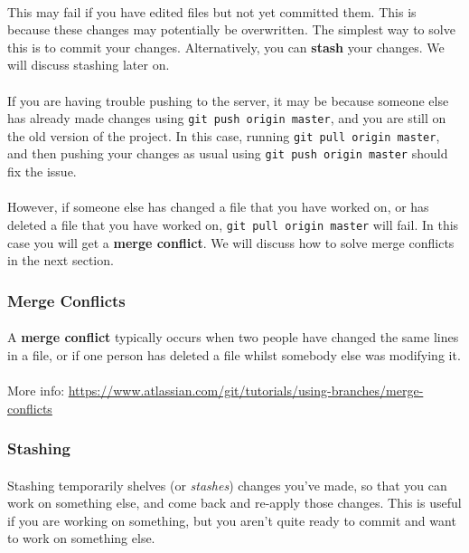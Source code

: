 \documentclass[11pt]{article}
\begin{document}
\paragraph{}
This may fail if you have edited files but not yet committed them. This is because these changes may potentially be overwritten. The simplest way to solve this is to commit your changes. Alternatively, you can \textbf{stash} your changes. We will discuss stashing later on.
\paragraph{}
If you are having trouble pushing to the server, it may be because someone else has already made changes using \lstinline{git push origin master}, and you are still on the old version of the project. In this case, running \lstinline{git pull origin master}, and then pushing your changes as usual using \lstinline{git push origin master} should fix the issue.
\paragraph{}
However, if someone else has changed a file that you have worked on, or has deleted a file that you have worked on, \lstinline{git pull origin master} will fail. In this case you will get a \textbf{merge conflict}. We will discuss how to solve merge conflicts in the next section.
\subsubsection{Merge Conflicts}
\paragraph{}
A \textbf{merge conflict} typically occurs when two people have changed the same lines in a file, or if one person has deleted a file whilst somebody else was modifying it.
\paragraph{}
More info: \url{https://www.atlassian.com/git/tutorials/using-branches/merge-conflicts}
\subsubsection{Stashing}
\paragraph{}
Stashing temporarily shelves (or \textit{stashes}) changes you've made, so that you can work on something else, and come back and re-apply those changes. This is useful if you are working on something, but you aren't quite ready to commit and want to work on something else.
\end{document}
